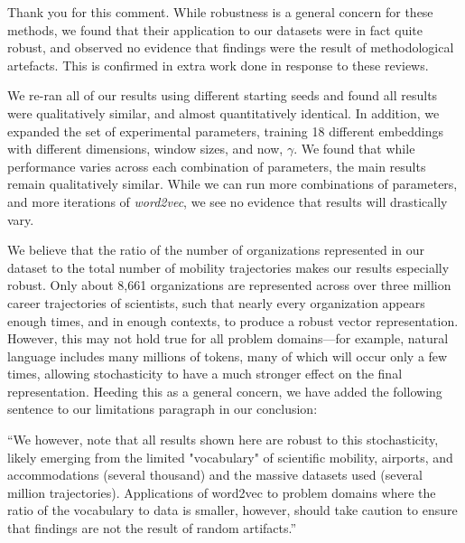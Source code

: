 \documentclass[12pt,a4paper]{article}
\newcommand{\response}[1]{{\leavevmode\noindent #1}}
\begin{document}
\response{%
Thank you for this comment. While robustness is a general concern for these methods, we found that their application to our datasets were in fact quite robust, and observed no evidence that findings were the result of methodological artefacts. This is confirmed in extra work done in response to these reviews. 

We re-ran all of our results using different starting seeds and found all results were qualitatively similar, and almost quantitatively identical. 
In addition, we expanded the set of experimental parameters, training 18 different embeddings with different dimensions, window sizes, and now, $\gamma$. 
We found that while performance varies across each combination of parameters, the main results remain qualitatively similar. 
While we can run more combinations of parameters, and more iterations of \textit{word2vec}, we see no evidence that results will drastically vary. 

We believe that the ratio of the number of organizations represented in our dataset to the total number of mobility trajectories makes our results especially robust. 
Only about 8,661 organizations are represented across over three million career trajectories of scientists, such that nearly every organization appears enough times, and in enough contexts, to produce a robust vector representation. 
However, this may not hold true for all problem domains—for example, natural language includes many millions of tokens, many of which will occur only a few times, allowing stochasticity to have a much stronger effect on the final representation. 
Heeding this as a general concern, we have added the following sentence to our limitations paragraph in our conclusion: 

“We however, note that all results shown here are robust to this stochasticity, likely emerging from the limited "vocabulary" of scientific mobility, airports, and accommodations (several thousand) and the massive datasets used (several million trajectories). Applications of word2vec to problem domains where the ratio of the vocabulary to data is smaller, however, should take caution to ensure that findings are not the result of random artifacts.”

}
\end{document}
